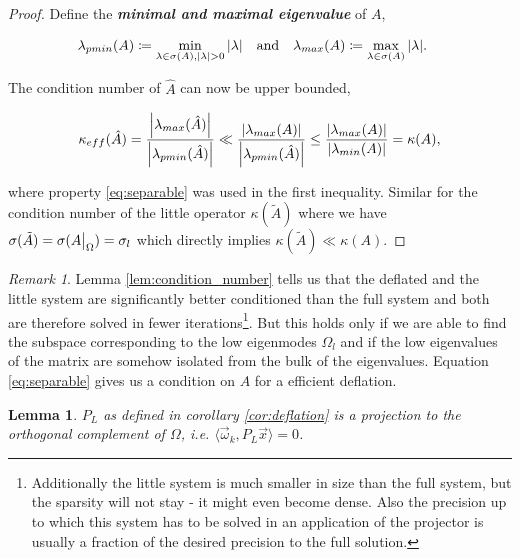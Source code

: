 \documentclass{article}
\newcommand\restr[2]{{%
  \left.\kern-\nulldelimiterspace %
  #1 %
  \vphantom{\big|} %
  \right|_{#2} %
  }
}
\theoremstyle{plain} %
\newtheorem{lemma}[theorem]{Lemma}
\theoremstyle{convention} %
\theoremstyle{remark} %
\newtheorem*{remark}{Remark} %
\def\df#1{\textbf{\textit{#1}}}
\numberwithin{equation}{section}
\begin{document}
\begin{proof}
Define the \df{minimal and maximal eigenvalue} of $A$,

\begin{align*}
    \lambda_{pmin}(A) &\coloneqq \min\limits_{\lambda \in \sigma(A), \abs{\lambda} > 0} \abs{\lambda}
    & &\text{and} &
    \lambda_{max}(A) &\coloneqq \max\limits_{\lambda \in \sigma(A)} \abs{\lambda}.
\end{align*}

The condition number of $\hat{A}$ can now be upper bounded,

\begin{align*}
    \kappa_{eff}({\hat{A}}) = \frac{\abs{\lambda_{max}(\hat{A})}}{\abs{\lambda_{pmin}(\hat{A})}} \ll \frac{\abs{\lambda_{max}(A)}}{\abs{\lambda_{pmin}(\hat{A})}} \le \frac{\abs{\lambda_{max}(A)}}{\abs{\lambda_{min}(A)}} = \kappa({A}),
\end{align*}

where property \eqref{eq:separable} was used in the first inequality. Similar for the condition number of the little operator $\kappa({\tilde{A}})$ where we have $\sigma(\tilde{A}) = \sigma(\restr{A}{\Omega}) = \sigma_l$ which directly implies $\kappa(\tilde{A}) \ll \kappa(A)$.

\end{proof}

\begin{remark}
Lemma \ref{lem:condition_number} tells us that the deflated and the little system are significantly better conditioned than the full system and both are therefore solved in fewer iterations\footnote{Additionally the little system is much smaller in size than the full system, but the sparsity will not stay - it might even become dense. Also the precision up to which this system has to be solved in an application of the projector is usually a fraction of the desired precision to the full solution.}. But this holds only if we are able to find the subspace corresponding to the low eigenmodes $\Omega_l$ and if the low eigenvalues of the matrix are somehow isolated from the bulk of the eigenvalues. Equation \eqref{eq:separable} gives us a condition on $A$ for a efficient deflation.
\end{remark}

\begin{lemma}

$P_L$ as defined in corollary \ref{cor:deflation} is a projection to the orthogonal complement of $\Omega$, i.e. $\langle \vec{\omega}_k, P_L \vec{x} \rangle = 0$.

\end{lemma}
\end{document}
